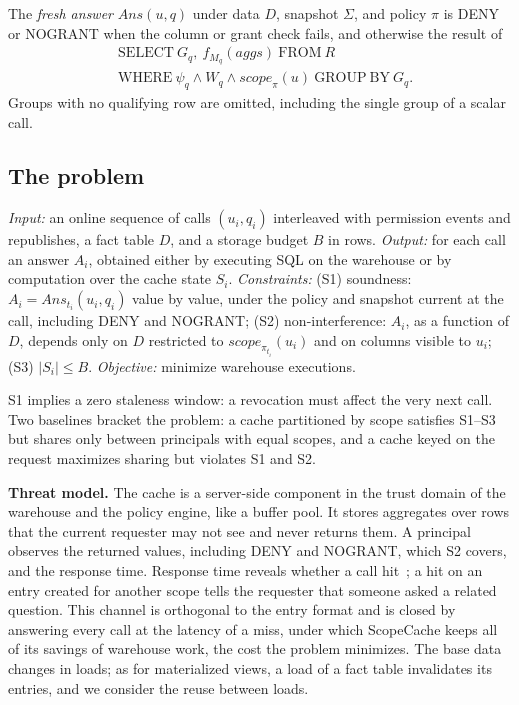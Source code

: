 \documentclass[sigconf, nonacm]{acmart}
\newcommand{\M}[1]{\textsf{#1}}
\newcommand{\scope}{\mathit{scope}}
\begin{document}
The \emph{fresh answer} $\mathit{Ans}(u,q)$ under data $D$, snapshot $\Sigma$, and policy $\pi$ is \M{DENY} or \M{NOGRANT} when the column or grant check fails, and otherwise the result of
\[
\begin{aligned}
&\mathrm{SELECT}\ G_q,\ f_{M_q}(\mathit{aggs})\ \mathrm{FROM}\ R\\
&\mathrm{WHERE}\ \psi_q\wedge W_q\wedge\scope_\pi(u)\ \mathrm{GROUP\ BY}\ G_q .
\end{aligned}
\]
Groups with no qualifying row are omitted, including the single group of a scalar call.

\subsection{The problem}

\begin{definition}
\label{def:problem}
\emph{Input:} an online sequence of calls $(u_i,q_i)$ interleaved with permission events and republishes, a fact table $D$, and a storage budget $B$ in rows. \emph{Output:} for each call an answer $A_i$, obtained either by executing SQL on the warehouse or by computation over the cache state $S_i$. \emph{Constraints:}
(S1) soundness: $A_i=\mathit{Ans}_{t_i}(u_i,q_i)$ value by value, under the policy and snapshot current at the call, including \M{DENY} and \M{NOGRANT};
(S2) non-interference: $A_i$, as a function of $D$, depends only on $D$ restricted to $\scope_{\pi_{t_i}}(u_i)$ and on columns visible to $u_i$;
(S3) $|S_i|\le B$.
\emph{Objective:} minimize warehouse executions.
\end{definition}

S1 implies a zero staleness window: a revocation must affect the very next call. Two baselines bracket the problem: a cache partitioned by scope satisfies S1--S3 but shares only between principals with equal scopes, and a cache keyed on the request maximizes sharing but violates S1 and S2.

\textbf{Threat model.} The cache is a server-side component in the trust domain of the warehouse and the policy engine, like a buffer pool. It stores aggregates over rows that the current requester may not see and never returns them. A principal observes the returned values, including \M{DENY} and \M{NOGRANT}, which S2 covers, and the response time. Response time reveals whether a call hit~\cite{gu25,song24}; a hit on an entry created for another scope tells the requester that someone asked a related question. This channel is orthogonal to the entry format and is closed by answering every call at the latency of a miss, under which ScopeCache keeps all of its savings of warehouse work, the cost the problem minimizes. The base data changes in loads; as for materialized views, a load of a fact table invalidates its entries, and we consider the reuse between loads.
\end{document}
